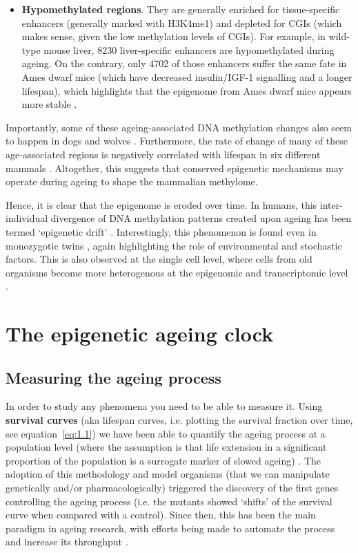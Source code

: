 \begin{itemize}
	\item \textbf{Hypomethylated regions}. They are generally enriched for tissue-specific enhancers (generally marked with H3K4me1) and depleted for \acrshort{CGI}s (which makes sense, given the low methylation levels of CGIs). For example, in wild-type mouse liver, 8230 liver-specific enhancers are hypomethylated during ageing. On the contrary, only 4702 of those enhancers suffer the same fate in Ames dwarf mice (which have decreased insulin/IGF-1 signalling and a longer lifespan), which highlights that the epigenome from Ames dwarf mice appears more stable \cite{Cole2017}.     
	
\end{itemize} 

Importantly, some of these ageing-associated DNA methylation changes also seem to happen in dogs and wolves \cite{Thompson2017}. Furthermore, the rate of change of many of these age-associated regions is negatively correlated with lifespan in six different mammals \cite{Lowe2018}. Altogether, this suggests that conserved epigenetic mechanisms may operate during ageing to shape the mammalian methylome.

\bigskip

Hence, it is clear that the epigenome is eroded over time. In humans, this inter-individual divergence of DNA methylation patterns created upon ageing has been termed `epigenetic drift' \cite{West2013}. Interestingly, this phenomenon is found even in monozygotic twins \cite{Fraga2005,Talens2012}, again highlighting the role of environmental and stochastic factors. This is also observed at the single cell level, where cells from old organisms become more heterogenous at the epigenomic and transcriptomic level \cite{Hernando-Herraez2018,Martinez-Jimenez2017}.

\bigskip

\section{The epigenetic ageing clock}

\subsection{Measuring the ageing process}

\smallskip

In order to study any phenomena you need to be able to measure it. Using \textbf{survival curves} (aka lifespan curves, i.e. plotting the survival fraction over time, see equation~\ref{eq:1.1}) we have been able to quantify the ageing process at a population level (where the assumption is that life extension in a significant proportion of the population is a surrogate marker of slowed ageing) \cite{Johnson2013}. The adoption of this methodology and model organisms (that we can manipulate genetically and/or pharmacologically) triggered the discovery of the first genes controlling the ageing process (i.e. the mutants showed `shifts' of the survival curve when compared with a control). Since then, this has been the main paradigm in ageing research, with efforts being made to automate the process and increase its throughput \cite{Stroustrup2013}.

